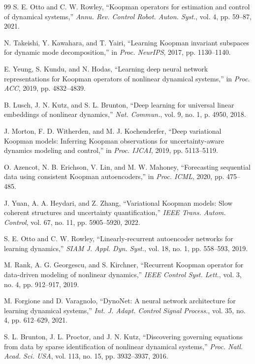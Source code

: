 \documentclass[journal]{IEEEtran}
\begin{document}
\begin{thebibliography}{99}
S. E. Otto and C. W. Rowley, ``Koopman operators for estimation and control of dynamical systems,'' \emph{Annu. Rev. Control Robot. Auton. Syst.}, vol. 4, pp. 59--87, 2021.

N. Takeishi, Y. Kawahara, and T. Yairi, ``Learning Koopman invariant subspaces for dynamic mode decomposition,'' in \emph{Proc. NeurIPS}, 2017, pp. 1130--1140.

E. Yeung, S. Kundu, and N. Hodas, ``Learning deep neural network representations for Koopman operators of nonlinear dynamical systems,'' in \emph{Proc. ACC}, 2019, pp. 4832--4839.

B. Lusch, J. N. Kutz, and S. L. Brunton, ``Deep learning for universal linear embeddings of nonlinear dynamics,'' \emph{Nat. Commun.}, vol. 9, no. 1, p. 4950, 2018.

J. Morton, F. D. Witherden, and M. J. Kochenderfer, ``Deep variational Koopman models: Inferring Koopman observations for uncertainty-aware dynamics modeling and control,'' in \emph{Proc. IJCAI}, 2019, pp. 5113--5119.

O. Azencot, N. B. Erichson, V. Lin, and M. W. Mahoney, ``Forecasting sequential data using consistent Koopman autoencoders,'' in \emph{Proc. ICML}, 2020, pp. 475--485.

J. Yuan, A. A. Heydari, and Z. Zhang, ``Variational Koopman models: Slow coherent structures and uncertainty quantification,'' \emph{IEEE Trans. Autom. Control}, vol. 67, no. 11, pp. 5905--5920, 2022.

S. E. Otto and C. W. Rowley, ``Linearly-recurrent autoencoder networks for learning dynamics,'' \emph{SIAM J. Appl. Dyn. Syst.}, vol. 18, no. 1, pp. 558--593, 2019.

M. Rank, A. G. Georgescu, and S. Kirchner, ``Recurrent Koopman operator for data-driven modeling of nonlinear dynamics,'' \emph{IEEE Control Syst. Lett.}, vol. 3, no. 4, pp. 912--917, 2019.

M. Forgione and D. Varagnolo, ``DynoNet: A neural network architecture for learning dynamical systems,'' \emph{Int. J. Adapt. Control Signal Process.}, vol. 35, no. 4, pp. 612--629, 2021.

S. L. Brunton, J. L. Proctor, and J. N. Kutz, ``Discovering governing equations from data by sparse identification of nonlinear dynamical systems,'' \emph{Proc. Natl. Acad. Sci. USA}, vol. 113, no. 15, pp. 3932--3937, 2016.


\end{thebibliography}
\end{document}
